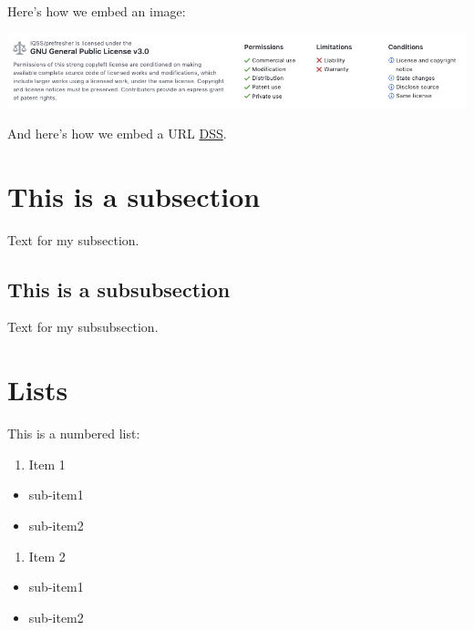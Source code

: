 \documentclass[]{book}
\providecommand{\tightlist}{%
  \setlength{\itemsep}{0pt}\setlength{\parskip}{0pt}}
\begin{document}
Here's how we embed an image:

\includegraphics{images/readme-license.png}

And here's how we embed a URL \href{https://dss.iq.harvard.edu/}{DSS}.

\hypertarget{this-is-a-subsection}{%
\section{This is a subsection}\label{this-is-a-subsection}}

Text for my subsection.

\hypertarget{this-is-a-subsubsection}{%
\subsection{This is a subsubsection}\label{this-is-a-subsubsection}}

Text for my subsubsection.

\hypertarget{lists}{%
\section{Lists}\label{lists}}

This is a numbered list:

\begin{enumerate}
\def\labelenumi{\arabic{enumi}.}
\tightlist
\item
  Item 1
\end{enumerate}

\begin{itemize}
\tightlist
\item
  sub-item1
\item
  sub-item2
\end{itemize}

\begin{enumerate}
\def\labelenumi{\arabic{enumi}.}
\setcounter{enumi}{1}
\tightlist
\item
  Item 2
\end{enumerate}

\begin{itemize}
\tightlist
\item
  sub-item1
\item
  sub-item2
\end{itemize}
\end{document}
